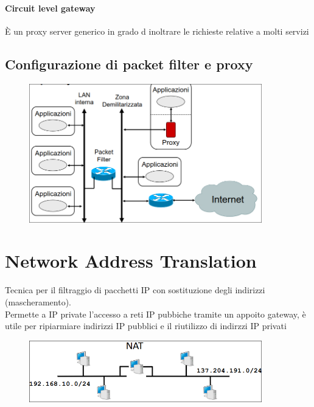 \documentclass{report}
\begin{document}
                \subsubsection{Circuit level gateway}
                    È un proxy server generico in grado d inoltrare le richieste relative a molti servizi
        \section{Configurazione di packet filter e proxy}
            \begin{figure}[H]
                \includegraphics[width=0.9\textwidth]{2/confPac.png}
            \end{figure}
    \chapter{Network Address Translation}
        Tecnica per il filtraggio di pacchetti IP con sostituzione degli indirizzi (mascheramento).
        \\
        Permette a IP private l'accesso a reti IP pubbiche tramite un appoito gateway, è utile per ripiarmiare indirizzi IP pubblici e il riutilizzo di indirzzi IP privati 
        \begin{figure}[H]
            \includegraphics[width=0.9\textwidth]{2/NAT.png}
        \end{figure}
\end{document}
